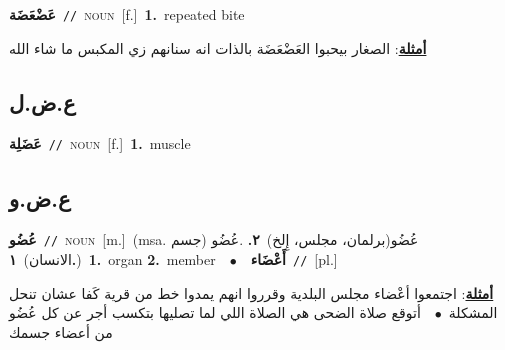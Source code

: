 \documentclass[10pt,a4paper,twoside]{article} %
\begin{document}
\begin{multicols}{2}
{\setlength\topsep{0pt}\textbf{\foreignlanguage{arabic}{عَضْعَضَة}}\ {\color{gray}\texttt{//}\color{black}}\ \textsc{noun}\ [f.]\ \textbf{1.}~repeated bite\  \begin{flushright}\color{gray}\foreignlanguage{arabic}{\textbf{\underline{\foreignlanguage{arabic}{أمثلة}}}: الصغار بيحبوا العَضْعَضَة بالذات انه سنانهم زي المكبس ما شاء الله}\end{flushright}\color{black}} \vspace{2mm}

\vspace{-3mm}
\subsection*{\color{blue}\foreignlanguage{arabic}{ع.ض.ل}\color{blue}{}} 

{\setlength\topsep{0pt}\textbf{\foreignlanguage{arabic}{عَضَلِة}}\ {\color{gray}\texttt{//}\color{black}}\ \textsc{noun}\ [f.]\ \textbf{1.}~muscle\ } \vspace{2mm}

\vspace{-3mm}
\subsection*{\color{blue}\foreignlanguage{arabic}{ع.ض.و}\color{blue}{}} 

{\setlength\topsep{0pt}\textbf{\foreignlanguage{arabic}{عُضُو}}\ {\color{gray}\texttt{//}\color{black}}\ \textsc{noun}\ [m.]\ \color{gray}(msa. \foreignlanguage{arabic}{عُضُو(برلمان، مجلس، إِلخ)}~\foreignlanguage{arabic}{\textbf{٢.}}  .\foreignlanguage{arabic}{عُضُو (جسم الانسان)}~\foreignlanguage{arabic}{\textbf{١.}})\color{black}\ \textbf{1.}~organ  \textbf{2.}~member\ \ $\bullet$\ \ \setlength\topsep{0pt}\textbf{\foreignlanguage{arabic}{أَعْضَاء}}\ {\color{gray}\texttt{//}\color{black}}\ [pl.]\  \begin{flushright}\color{gray}\foreignlanguage{arabic}{\textbf{\underline{\foreignlanguage{arabic}{أمثلة}}}: اجتمعوا أعْضاء مجلس البلدية وقرروا انهم يمدوا خط من قرية كَفا عشان تنحل المشكلة\ $\bullet$\ \  أتوقع صلاة الضحى هي الصلاة اللي لما تصليها بتكسب أجر عن كل عُضُو من أعضاء جسمك}\end{flushright}\color{black}} \vspace{2mm}


\end{multicols}
\end{document}
